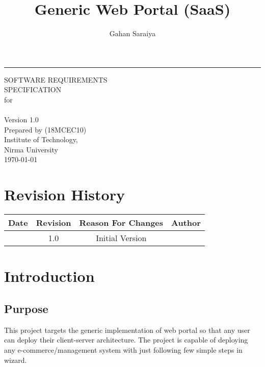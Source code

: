 \documentclass{scrreprt}
\date{}
\title{Generic Web Portal (SaaS)}
\author{Gahan Saraiya}
\def\myversion{1.0 }
\def\university{Institute of Technology, \\Nirma University}
\begin{document}
\begin{flushright}
    \rule{16cm}{5pt}\vskip1cm
    \begin{bfseries}
        \Huge{SOFTWARE REQUIREMENTS\\ SPECIFICATION}\\
        for\\
        \vspace{1.9cm}
        \thetitle\\
        \vspace{1.9cm}
        \LARGE{Version \myversion}\\
        \vspace{1.9cm}
        Prepared by \theauthor (18MCEC10)\\
        \vspace{1.9cm}
        \university\\
        \vspace{1.9cm}
        \today\\
    \end{bfseries}
\end{flushright}

\tableofcontents  %
\listoffigures  %

\chapter*{Revision History}
\begin{center}
    \begin{tabular}{|c|c|c|c|}
        \hline
	    Date & Revision & Reason For Changes & Author \\
        \hline
	     & 1.0 & Initial Version & \theauthor\\
        \hline
    \end{tabular}
\end{center}

\chapter{Introduction}
\label{introduction}

\section{Purpose}
\label{purpose}
This project targets the generic implementation of web portal so that any user can deploy their client-server architecture.
The project is capable of deploying any e-commerce/management system with just following few simple steps in wizard.
\end{document}
